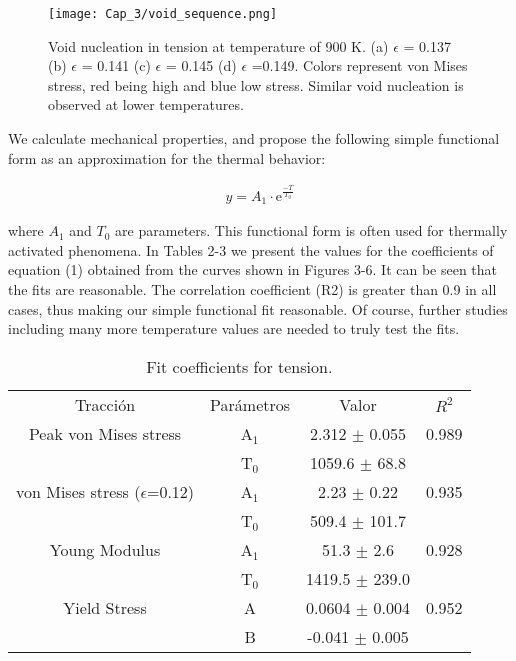 \begin{figure}[htp]
\centering
\texttt{[image: Cap\_3/void\_sequence.png]}
\caption{Void nucleation in tension at temperature of 900 K. (a) $\epsilon$ = 0.137 (b) $\epsilon$ = 0.141 (c) $\epsilon$ = 0.145 (d) $\epsilon$ =0.149. Colors represent von Mises stress, red being high and blue low stress. Similar void nucleation is observed at lower temperatures.}
\label{C3:fg:voidSeq}
\end{figure}

We calculate mechanical properties, and propose the following simple functional form as an approximation for the thermal behavior:

\begin{eqnarray}
y = A_{1}\cdot \mathrm{e}^{\frac{-T}{T_{0}}}
\label{C3:eq:thermalFit}
\end{eqnarray}
	
where $A_{1}$ and $T_{0}$ are parameters. This functional form is often used for thermally activated phenomena. In Tables 2-3 we present the values for the coefficients of equation (1) obtained from the curves shown in Figures 3-6. It can be seen that the fits are reasonable. The correlation coefficient (R2) is greater than 0.9 in all cases, thus making our simple functional fit reasonable. Of course, further studies including many more temperature values are needed to truly test the fits. 

\begin{table}[htp]
\caption{Fit coefficients for tension.}
\begin{center}
\begin{tabular}{*{4}{c}}
Tracción & Parámetros & Valor & $R^{2}$ \\
Peak von Mises stress & A$_{1}$ & 2.312 $\pm$ 0.055 & 0.989 \\
 & T$_{0}$ & 1059.6 $\pm$ 68.8 & \\
von Mises stress ($\epsilon$=0.12) & A$_{1}$ & 2.23 $\pm$ 0.22 & 0.935 \\
 & T$_{0}$ & 509.4 $\pm$ 101.7 & \\
Young Modulus & A$_{1}$ & 51.3 $\pm$ 2.6 & 0.928 \\
 & T$_{0}$ & 1419.5 $\pm$ 239.0 & \\
Yield Stress & A & 0.0604 $\pm$ 0.004 & 0.952 \\
 & B & -0.041 $\pm$ 0.005 & 
\end{tabular}
\end{center}
\label{C3:tb:initPropsTen}
\end{table}

